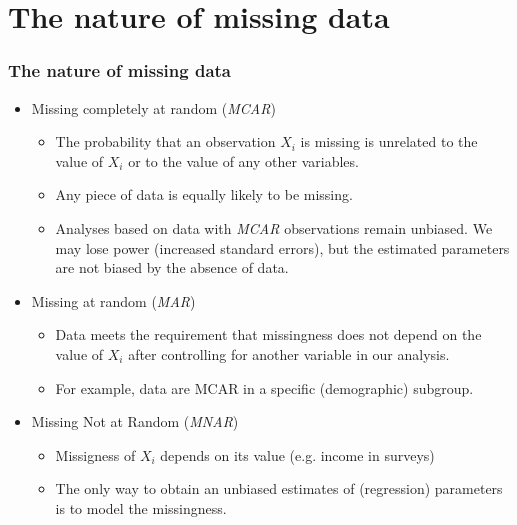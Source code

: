 \documentclass{beamer}
\begin{document}
\section{The nature of missing data}
\begin{frame}
\frametitle{The nature of missing data}

\begin{itemize}
  \item[] Missing completely at random (\textit{MCAR})
  \begin{itemize}
  \item The probability that an observation $X_i$ is missing is unrelated to the value of $X_i$ or to the value of any other variables.
  \item Any piece of data is equally likely to be missing.
  \item Analyses based on data with \textit{MCAR} observations remain unbiased. We may lose power (increased standard errors), but the estimated parameters are not biased by the absence of data.
  \end{itemize}
  \vspace{0.2cm}
  \item[] Missing at random (\textit{MAR})
  \begin{itemize}
  \item Data meets the requirement that missingness does not depend on the value of $X_i$ after controlling for another variable in our analysis.
  \item For example, data are MCAR in a specific (demographic) subgroup. 
  \end{itemize}
  \vspace{0.2cm}
  \item[] Missing Not at Random (\textit{MNAR})
  \begin{itemize}
  \item Missigness of $X_i$ depends on its value (e.g. income in surveys)
  \item The only way to obtain an unbiased estimates of (regression) parameters is to model the missingness.
  \end{itemize}
\end{itemize}


\end{frame}

\end{document}
